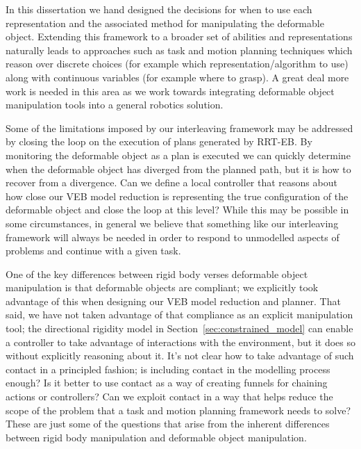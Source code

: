 In this dissertation we hand designed the decisions for when to use each representation and the associated method for manipulating the deformable object. Extending this framework to a broader set of abilities and representations naturally leads to approaches such as task and motion planning techniques which reason over discrete choices (for example which representation/algorithm to use) along with continuous variables (for example where to grasp). A great deal more work is needed in this area as we work towards integrating deformable object manipulation tools into a general robotics solution.

Some of the limitations imposed by our interleaving framework may be addressed by closing the loop on the execution of plans generated by RRT-EB. By monitoring the deformable object as a plan is executed we can quickly determine when the deformable object has diverged from the planned path, but it is  how to recover from a divergence. Can we define a local controller that reasons about how close our VEB model reduction is representing the true configuration of the deformable object and close the loop at this level? While this may be possible in some circumstances, in general we believe that something like our interleaving framework will always be needed in order to respond to unmodelled aspects of problems and continue with a given task.

One of the key differences between rigid body verses deformable object manipulation is that deformable objects are compliant; we explicitly took advantage of this when designing our VEB model reduction and planner. That said, we have not taken advantage of that compliance as an explicit manipulation tool; the directional rigidity model in Section~\ref{sec:constrained_model} can enable a controller to take advantage of interactions with the environment, but it does so without explicitly reasoning about it. It's not clear how to take advantage of such contact in a principled fashion; is including contact in the modelling process enough? Is it better to use contact as a way of creating funnels for chaining actions or controllers? Can we exploit contact in a way that helps reduce the scope of the problem that a task and motion planning framework needs to solve? These are just some of the questions that arise from the inherent differences between rigid body manipulation and deformable object manipulation.